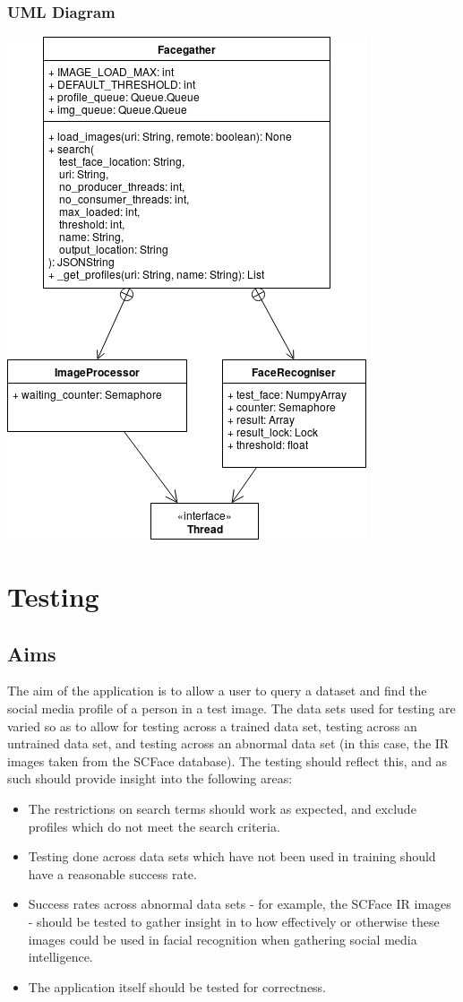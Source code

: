 \documentclass[12pt]{article}
\begin{document}
\subsubsection{UML Diagram}
\includegraphics[scale=1]{res/facegather_uml.png}

\section{Testing}
\subsection{Aims}
The aim of the application is to allow a user to query a dataset and find the social media profile of a person in a test image. The data sets used for testing are varied so as to allow for testing across a trained data set, testing across an untrained data set, and testing across an abnormal data set (in this case, the IR images taken from the SCFace database). The testing should reflect this, and as such should provide insight into the following areas:

\begin{itemize}
\item{The restrictions on search terms should work as expected, and exclude profiles which do not meet the search criteria.}
\item{Testing done across data sets which have not been used in training should have a reasonable success rate.}
\item{Success rates across abnormal data sets - for example, the SCFace IR images - should be tested to gather insight in to how effectively or otherwise these images could be used in facial recognition when gathering social media intelligence.}
\item{The application itself should be tested for correctness.}
\end{itemize}
\end{document}
